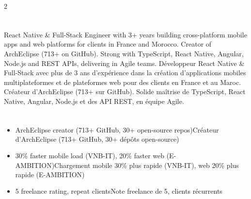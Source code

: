 \documentclass[10pt,a4paper]{article}
\newcommand{\ghstar}{\textcolor{accent!65}{\faStar}}
\providecommand{\archEclipseStars}{713}
\begin{document}
\begin{paracol}{2}


\section*{}

{
React Native \& Full-Stack Engineer with 3+ years building cross-platform mobile apps and web platforms for clients in France and Morocco. Creator of ArchEclipse (\archEclipseStars+\ghstar{} on GitHub). Strong with TypeScript, React Native, Angular, Node.js and REST APIs, delivering in Agile teams.
}
{
Développeur React Native \& Full-Stack avec plus de 3 ans d'expérience dans la création d'applications mobiles multiplateformes et de plateformes web pour des clients en France et au Maroc. Créateur d'ArchEclipse (\archEclipseStars+\ghstar{} sur GitHub). Solide maîtrise de TypeScript, React Native, Angular, Node.js et des API REST, en équipe Agile.
}


\section*{}


\begin{itemize}
\item
{}
{ArchEclipse creator (\archEclipseStars+\ghstar{} GitHub, 30+ open-source repos)}{Créateur d'ArchEclipse (\archEclipseStars+\ghstar{} GitHub, 30+ dépôts open-source)}
\item
{}
{30\% faster mobile load (VNB-IT), 20\% faster web (E-AMBITION)}{Chargement mobile 30\% plus rapide (VNB-IT), web 20\% plus rapide (E-AMBITION)}
\item
{}
{5\ghstar{} freelance rating, repeat clients}{Note freelance de 5\ghstar{}, clients récurrents}
\end{itemize}




\section*{}


\end{paracol}
\end{document}
